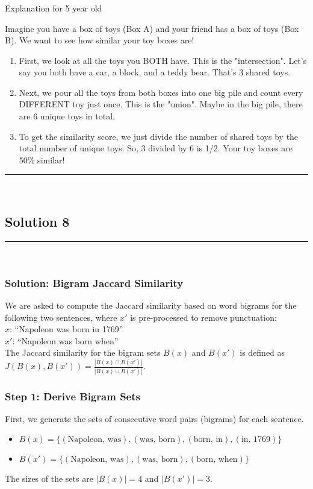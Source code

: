 \documentclass{article}
\begin{document}
\subsubsection*{\normalfont}{Explanation for 5 year old}

\parbox{\textwidth}{
Imagine you have a box of toys (Box A) and your friend has a box of toys (Box B). We want to see how similar your toy boxes are!
\begin{enumerate}
    \item First, we look at all the toys you BOTH have. This is the "intersection". Let's say you both have a car, a block, and a teddy bear. That's 3 shared toys.
    \item Next, we pour all the toys from both boxes into one big pile and count every DIFFERENT toy just once. This is the "union". Maybe in the big pile, there are 6 unique toys in total.
    \item To get the similarity score, we just divide the number of shared toys by the total number of unique toys. So, 3 divided by 6 is 1/2. Your toy boxes are 50\% similar!
\end{enumerate}
}

\noindent\rule{\textwidth}{0.4pt}\\

\newpage

\subsection*{Solution 8}
\noindent\rule{\textwidth}{0.4pt}\\
\subsubsection*{Solution: Bigram Jaccard Similarity}
\parbox{\textwidth}{
We are asked to compute the Jaccard similarity based on word bigrams for the following two sentences, where $x'$ is pre-processed to remove punctuation:
\\
$x$: ``Napoleon was born in 1769''
\\
$x'$: ``Napoleon was born when''
\\
The Jaccard similarity for the bigram sets $B(x)$ and $B(x')$ is defined as $J(B(x), B(x')) = \frac{|B(x) \cap B(x')|}{|B(x) \cup B(x')|}$.
}

\subsubsection*{Step 1: Derive Bigram Sets}
\parbox{\textwidth}{
First, we generate the sets of consecutive word pairs (bigrams) for each sentence.
\begin{itemize}
    \item $B(x) = \{(\text{Napoleon, was}), (\text{was, born}), (\text{born, in}), (\text{in, 1769})\}$
    \item $B(x') = \{(\text{Napoleon, was}), (\text{was, born}), (\text{born, when})\}$
\end{itemize}
The sizes of the sets are $|B(x)| = 4$ and $|B(x')| = 3$.
}
\end{document}
